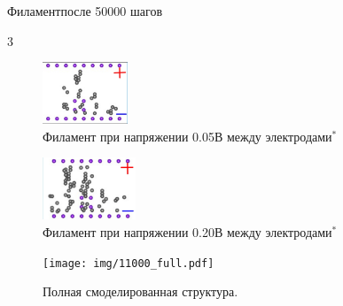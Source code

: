 \documentclass{beamer}%
\begin{document}
\begin{frame}{Филамент}{после 50000 шагов}

\begin {multicols} {3}
\begin{figure}

    \centering
    \includegraphics[height=70px]{img/filament/filament__1.jpg}
    \caption{Филамент при напряжении 0.05В между электродами\( ^*\)}
\end{figure}

\columnbreak
\begin{figure}
    \centering
    \includegraphics[height=70px]{img/filament/filament__2.jpg}
    \caption{Филамент при напряжении 0.20В между электродами\( ^*\)}
\end{figure}
\columnbreak
\begin{figure}
    \centering
    \texttt{[image: img/11000\_full.pdf]}
    \caption{Полная смоделированная структура.
    }
\end{figure}
\end{multicols}
\end{frame}
\end{document}
